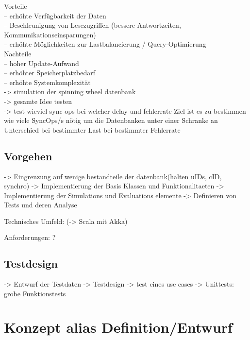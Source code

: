 \documentclass[a4paper,11pt,oneside,%
headsepline,												%
footsepline,												%
bibtotocnumbered									%
]{scrreprt}
\begin{document}
Vorteile\\
– erhöhte Verfügbarkeit der Daten\\
– Beschleunigung von Lesezugriffen (bessere Antwortzeiten,
Kommunikationseinsparungen)\\
– erhöhte Möglichkeiten zur Lastbalancierung / Query-Optimierung\\

Nachteile\\
– hoher Update-Aufwand\\
– erhöhter Speicherplatzbedarf\\
– erhöhte Systemkomplexität\\

-> simulation der spinning wheel datenbank\\
-> gesamte Idee testen\\
-> test wieviel sync ops bei welcher delay und fehlerrate
Ziel ist es zu bestimmen wie viele SyncOps/s nötig um die Datenbanken unter einer Schranke an Unterschied bei bestimmter Last bei bestimmter Fehlerrate

\section{Vorgehen}
-> Eingrenzung auf wenige bestandteile der datenbank(halten uIDs, cID, synchro)
-> Implementierung der Basis Klassen und Funktionalitaeten 
-> Implementierung der Simulations und Evaluations elemente
-> Definieren von Tests und deren Analyse

Technisches Umfeld:
(-> Scala mit Akka)

Anforderungen:
?

\section{Testdesign}
-> Entwurf der Testdaten
-> Testdesign -> test eines use cases
-> Unittests: grobe Funktionstests 


\chapter{Konzept alias Definition/Entwurf}
\end{document}
